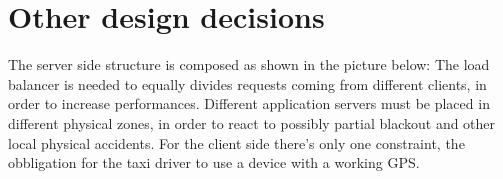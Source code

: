 \section{Other design decisions}
The server side structure is composed as shown in the picture below:
The load balancer is needed to equally divides requests coming from different clients, in order to increase performances.
Different application servers must be placed in different physical zones, in order to react to possibly partial blackout and other
local physical accidents.
For the client side there's only one constraint, the obbligation for the taxi driver to use a device with a working GPS.
